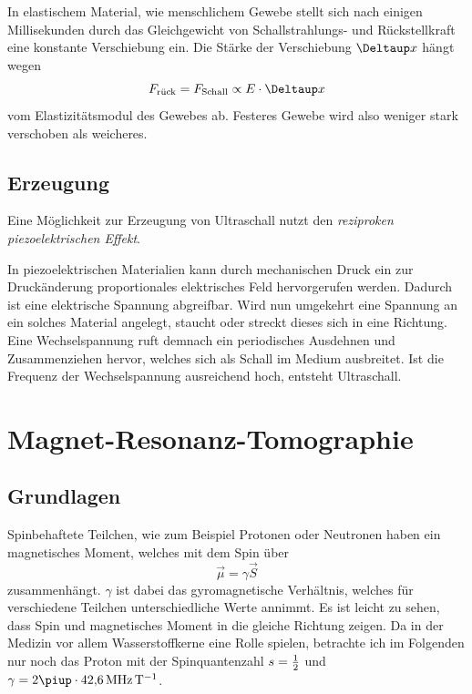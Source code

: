 \documentclass[
    11pt,
    ngerman
]{scrreprt}
\begin{document}
In elastischem Material, wie menschlichem Gewebe stellt sich nach einigen Millisekunden durch das Gleichgewicht von Schallstrahlungs- und Rückstellkraft  eine konstante Verschiebung ein. Die Stärke der Verschiebung $\Deltaup x$ hängt wegen 
\[
    F_\text{rück} = F_\text{Schall} \propto E\cdot\Deltaup x
\]
vom Elastizitätsmodul des Gewebes ab. Festeres Gewebe wird also weniger stark verschoben als weicheres.


\subsection{Erzeugung}

Eine Möglichkeit zur Erzeugung von Ultraschall nutzt den
\emph{reziproken piezoelektrischen Effekt}.

In piezoelektrischen Materialien kann durch mechanischen Druck ein zur
Druckänderung proportionales elektrisches Feld hervorgerufen werden. Dadurch
ist eine elektrische Spannung abgreifbar. Wird nun umgekehrt eine Spannung an
ein solches Material angelegt, staucht oder streckt dieses sich in eine
Richtung. Eine Wechselspannung ruft demnach ein periodisches Ausdehnen und
Zusammenziehen hervor, welches sich als Schall im Medium ausbreitet. Ist die
Frequenz der Wechselspannung ausreichend hoch, entsteht Ultraschall.

\section{Magnet-Resonanz-Tomographie}

\subsection{Grundlagen}

Spinbehaftete Teilchen, wie zum Beispiel Protonen oder Neutronen haben ein magnetisches Moment, welches mit dem Spin über
\[
    \vec\mu = \gamma\vec S
\]
zusammenhängt. $\gamma$ ist dabei das gyromagnetische Verhältnis, welches für
verschiedene Teilchen unterschiedliche Werte annimmt. Es ist leicht zu sehen,
dass Spin und magnetisches Moment in die gleiche Richtung zeigen. Da in der
Medizin vor allem Wasserstoffkerne eine Rolle spielen, betrachte ich im
Folgenden nur noch das Proton mit der Spinquantenzahl $s = \frac 12$ und $\gamma =
2\piup\cdot\SI{42.6}{\mega\hertz\per\tesla}$.
\end{document}
